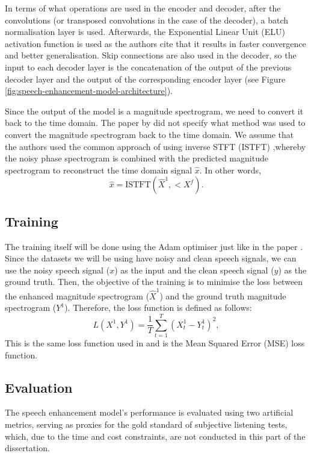 \documentclass[logo,bsc,singlespacing,parskip,online]{infthesis}
\begin{document}
In terms of what operations are used in the encoder and decoder, after the convolutions (or transposed convolutions in the case of the decoder),
a batch normalisation layer is used. Afterwards, the Exponential Linear Unit (ELU) activation function is used 
as the authors cite that it results in faster convergence and better generalisation. Skip connections 
are also used in the decoder, so the input to each decoder layer is the concatenation of the output of the previous decoder layer 
and the output of the corresponding encoder layer (see Figure \ref{fig:speech-enhancement-model-architecture}).

Since the output of the model is a magnitude spectrogram, we need to convert it back to the time domain. 
The paper by \citet{tan18_interspeech} did not specify what method was used to convert the magnitude spectrogram back to the time domain.
We assume that the authors used the common approach of using inverse STFT (ISTFT) \citep{xu_regression_2015},whereby the noisy phase spectrogram 
is combined with the predicted magnitude spectrogram to reconstruct the time domain signal $\hat{x}$. In other words,
\[
\hat{x} = \text{ISTFT}(\hat{X}^{1}, <X^{f}).
\]
\subsection{Training}
The training itself will be done using the Adam optimiser just like in the paper \citep{tan18_interspeech}.
Since the datasets we will be using have noisy and clean speech signals, we can use the noisy speech signal ($x$) as the input
and the clean speech signal ($y$) as the ground truth.
Then, the objective of the training is to minimise the loss between the enhanced magnitude spectrogram ($\hat{X}^{1}$) 
and the ground truth magnitude spectrogram ($Y^{1}$).
Therefore, the loss function is defined as follows:
\[
L(X^{1}, Y^{1}) = \frac{1}{T} \sum_{t=1}^{T} (X^{1}_t - Y^{1}_t)^2,
\]
This is the same loss function used in \citet{tan18_interspeech} and is the Mean Squared Error (MSE) loss function.

\subsection{Evaluation}
The speech enhancement model's performance is evaluated using two artificial metrics, 
serving as proxies for the gold standard of subjective listening tests, which, 
due to the time and cost constraints, are not conducted in this part of the dissertation.
\end{document}
